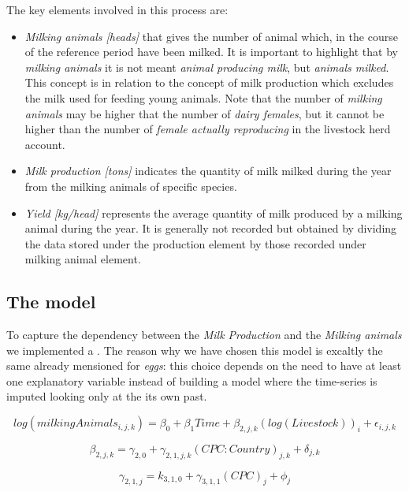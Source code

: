 \documentclass[nojss]{jss}
\begin{document}
The key elements involved in this process are:
\begin{itemize}
\item{\textit{Milking animals [heads]} that gives the number of animal which, in the course of the reference period have been milked. It is important to highlight that by \textit{milking animals} it is not meant \textit{animal producing milk}, but \textit{animals milked}. This concept is in relation to the concept of milk production which excludes the milk used for feeding young animals. Note that the number of \textit{milking animals} may be higher that the number of \textit{dairy females}, but it cannot be higher than the number of \textit{female actually reproducing} in the livestock herd account.}

\item{\textit{Milk production [tons]} indicates the quantity of milk milked during the year from the milking animals of specific species.}
\item{\textit{Yield [kg/head]} represents the average quantity of milk produced by a milking animal during the year. It is generally not recorded but obtained by dividing the data stored under the production element by those recorded under milking animal element.}
\end{itemize}


\subsection{The model}

To capture the dependency between the \textit{Milk Production} and the \textit{Milking animals} we implemented a . The reason why we have chosen this model is excaltly the same already mensioned for \textit{eggs}: this choice depends on the need to have at least one explanatory variable instead of building a model where the time-series is imputed looking only at the its own past.


\begin{dmath*}
log(milkingAnimals_{i,j,k})= \beta_0 + \beta_{1}Time + \beta_{2,j,k}(log(Livestock))_{i}+\epsilon_{i,j,k}
\end{dmath*}


\begin{dmath*}
\beta_{2,j,k}= \gamma_{2,0} + \gamma_{2,1,j,k}(CPC:Country)_{j,k}+\delta_{j,k}
\end{dmath*}


\begin{dmath*}
\gamma_{2,1,j}= k_{3,1,0} + \gamma_{3,1,1}(CPC)_j +\phi_{j}
\end{dmath*}
\end{document}
